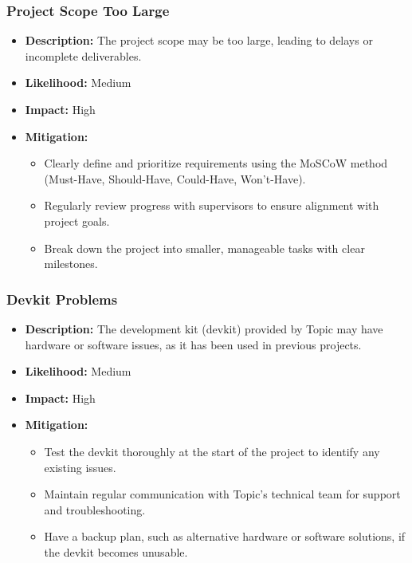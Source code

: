 \documentclass{article}
\begin{document}
\subsubsection{Project Scope Too Large}
\begin{itemize}
    \item \textbf{Description:} The project scope may be too large, leading to delays or incomplete deliverables.
    \item \textbf{Likelihood:} Medium
    \item \textbf{Impact:} High
    \item \textbf{Mitigation:} 
        \begin{itemize}
            \item Clearly define and prioritize requirements using the MoSCoW method (Must-Have, Should-Have, Could-Have, Won't-Have).
            \item Regularly review progress with supervisors to ensure alignment with project goals.
            \item Break down the project into smaller, manageable tasks with clear milestones.
        \end{itemize}
\end{itemize}

\subsubsection{Devkit Problems}
\begin{itemize}
    \item \textbf{Description:} The development kit (devkit) provided by Topic may have hardware or software issues, as it has been used in previous projects.
    \item \textbf{Likelihood:} Medium
    \item \textbf{Impact:} High
    \item \textbf{Mitigation:}
        \begin{itemize}
            \item Test the devkit thoroughly at the start of the project to identify any existing issues.
            \item Maintain regular communication with Topic's technical team for support and troubleshooting.
            \item Have a backup plan, such as alternative hardware or software solutions, if the devkit becomes unusable.
        \end{itemize}
\end{itemize}
\end{document}
